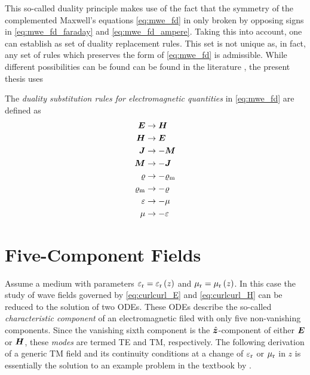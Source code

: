 This so-called duality principle makes use of the fact that the symmetry of the
complemented Maxwell's equations \eqref{eq:mwe_fd} in only broken by
opposing signs in \eqref{eq:mwe_fd_faraday} and \eqref{eq:mwe_fd_ampere}.
Taking this into account, one can establish as set of duality replacement rules.
This set is not unique as, in fact, any set of rules which preserves the form
of \eqref{eq:mwe_fd} is admissible.
While different possibilities can be found can be found in the literature
\cite{Jin2015,Harrington2001,Chew1999}, the present thesis uses
\begin{definition}
	The \emph{duality substitution rules for electromagnetic quantities} in
	\eqref{eq:mwe_fd} are defined as \cite[9]{Chew1999}
	\begin{subequations}
		\begin{align}
		\pvec{E} &\to \pvec{H} \\
		\pvec{H} &\to \pvec{E} \\
		\pvec{J} &\to -\pvec{M} \\
		\pvec{M} &\to -\pvec{J} \\
		\varrho &\to -\varrho_\mathrm{m} \\
		\varrho_\mathrm{m} &\to -\varrho \\
		\varepsilon &\to -\mu \\
		\mu &\to -\varepsilon 
		\end{align}
	\end{subequations}
\end{definition}











\section{Five-Component Fields}
\label{sec:five_component_fields}

Assume a medium with parameters $\varepsilon_{\mathrm{r}} = \varepsilon_{\mathrm{r}}\left(z\right)$ and
$\mu_{\mathrm{r}} = \mu_{\mathrm{r}}\left(z\right)$.
In this case the study of wave fields governed by \eqref{eq:curlcurl_E} and
\eqref{eq:curlcurl_H} can be reduced to the solution of two \acsp{ODE}.
These \acsp{ODE} describe the so-called \emph{characteristic component} of an
electromagnetic filed with only five non-vanishing components.
Since the vanishing sixth component is the $\uv{z}$-component of either 
$\pvec{E}$ or $\pvec{H}$, these \emph{modes} are termed \ac{TE} and \ac{TM},
respectively.
The following derivation of a generic \ac{TM} field and its continuity
conditions at a change of $\varepsilon_{\mathrm{r}}$ or $\mu_{\mathrm{r}}$ in $z$ is essentially the solution
to an example problem in the textbook by \textcite[140]{Chew1999}.

